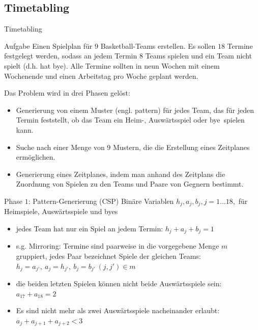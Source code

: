 \documentclass[hyperref={pdfpagelabels=false}]{beamer}
\begin{document}
\subsection{Timetabling}
\begin{frame}[allowframebreaks]{Timetabling}
\nocite{Timetabling}
\small

\begin{block}{Aufgabe}
Einen Spielplan für $9$ Basketball-Teams erstellen. Es sollen $18$ Termine festgelegt werden, sodass an jedem Termin $8$ Teams spielen und ein Team nicht spielt (d.h. hat \glqq bye\grqq). Alle Termine sollten in neun Wochen mit einem Wochenende und einen Arbeitstag pro Woche geplant werden.
\end{block}

\newpage

Das Problem wird in drei Phasen gelöst: \begin{itemize}
\setlength{\itemsep}{0pt}
\item Generierung von einem Muster (engl. pattern) für jedes Team, das für jeden Termin feststellt, ob das Team ein Heim-, Auswärtsspiel oder \glqq bye\grqq\ spielen kann. 
\item Suche nach einer Menge von 9 Mustern, die die Erstellung eines
Zeitplanes ermöglichen.
\item Generierung eines Zeitplanes, indem man anhand des Zeitplans die Zuordnung von Spielen zu den Teams und Paare von Gegnern bestimmt.
\end{itemize}

\newpage

\begin{block}{Phase $1$: Pattern-Generierung (CSP)}
Binäre Variablen $h_j, a_j, b_j, j=1\dots 18,$ für Heimspiele, Auswärtsspiele und byes 
\begin{itemize}
\setlength{\itemsep}{0pt}
\item jedes Team hat nur ein Spiel an jedem Termin: $h_j+a_j+b_j = 1$

\item s.g. Mirroring: Termine sind paarweise in die vorgegebene Menge $m$ gruppiert, jedes Paar bezeichnet Spiele der gleichen Teams: $h_j=a_{j'},\ a_j=h_{j'},\ b_j=b_{j'}\ (j, j')\in m$

\item die beiden letzten Spielen können nicht beide Auswärtsspiele sein: $a_{17}+a_{18} = 2$

\item Es sind nicht mehr als zwei Auswärtsspiele nacheinander erlaubt:\\ $a_j+a_{j+1}+a_{j+2}<3$ 


\end{itemize}
\end{block}
\end{frame}
\end{document}
